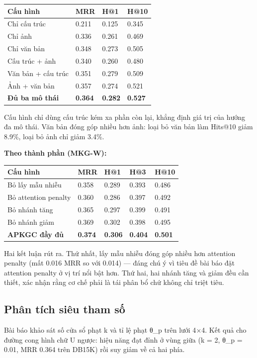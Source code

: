 \documentclass[11pt,a4paper]{article}
\newcommand{\code}[1]{{\ttfamily\small\color{codetext}#1}}
\begin{document}
\begin{center}\small
\begin{tabular}{@{}llll@{}}
\toprule
\textbf{Cấu hình} & \textbf{MRR} & \textbf{H@1} & \textbf{H@10}\\
\midrule
Chỉ cấu trúc & 0.211 & 0.125 & 0.345\\
Chỉ ảnh & 0.336 & 0.261 & 0.469\\
Chỉ văn bản & 0.348 & 0.273 & 0.505\\
Cấu trúc + ảnh & 0.340 & 0.260 & 0.480\\
Văn bản + cấu trúc & 0.351 & 0.279 & 0.509\\
Ảnh + văn bản & 0.357 & 0.274 & 0.521\\
\textbf{Đủ ba mô thái} & \textbf{0.364} & \textbf{0.282} & \textbf{0.527}\\
\bottomrule
\end{tabular}
\end{center}
Cấu hình chỉ dùng cấu trúc kém xa phần còn lại, khẳng định giá trị của hướng đa mô thái. Văn bản đóng góp nhiều hơn ảnh: loại bỏ văn bản làm Hits@10 giảm 8.9\%, loại bỏ ảnh chỉ giảm 3.4\%.

\textbf{Theo thành phần (MKG-W):}

\begin{center}\small
\begin{tabular}{@{}lllll@{}}
\toprule
\textbf{Cấu hình} & \textbf{MRR} & \textbf{H@1} & \textbf{H@3} & \textbf{H@10}\\
\midrule
Bỏ lấy mẫu nhiễu & 0.358 & 0.289 & 0.393 & 0.486\\
Bỏ attention penalty & 0.360 & 0.286 & 0.397 & 0.492\\
Bỏ nhánh tăng & 0.365 & 0.297 & 0.399 & 0.491\\
Bỏ nhánh giảm & 0.369 & 0.302 & 0.398 & 0.495\\
\textbf{APKGC đầy đủ} & \textbf{0.374} & \textbf{0.306} & \textbf{0.404} & \textbf{0.501}\\
\bottomrule
\end{tabular}
\end{center}
Hai kết luận rút ra. Thứ nhất, lấy mẫu nhiễu đóng góp nhiều hơn attention penalty (mất 0.016 MRR so với 0.014) --- đáng chú ý vì tiêu đề bài báo đặt attention penalty ở vị trí nổi bật hơn. Thứ hai, hai nhánh tăng và giảm đều cần thiết, xác nhận rằng cơ chế phải là tái phân bổ chứ không chỉ triệt tiêu.

\subsection{Phân tích siêu tham số}
Bài báo khảo sát số cửa sổ phạt \code{k} và tỉ lệ phạt \code{θ\_p} trên lưới 4$\times$4. Kết quả cho đường cong hình chữ U ngược: hiệu năng đạt đỉnh ở vùng giữa (\code{k = 2}, \code{θ\_p = 0.01}, MRR 0.364 trên DB15K) rồi suy giảm về cả hai phía.
\end{document}
